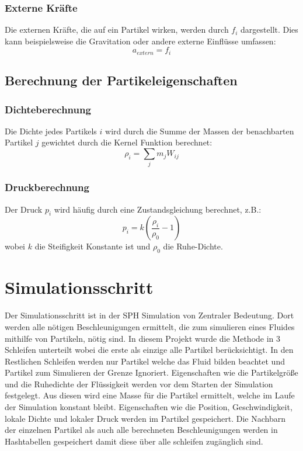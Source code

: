 \documentclass[a4paper, 12pt]{article}
\begin{document}
\subsubsection{Externe Kräfte}
Die externen Kräfte, die auf ein Partikel wirken, werden durch \( f_i \) dargestellt. Dies kann beispielsweise die Gravitation oder andere externe Einflüsse umfassen:
\begin{equation}
	a_{extern} = f_i
\end{equation}
\subsection{Berechnung der Partikeleigenschaften}
\subsubsection{Dichteberechnung}
Die Dichte jedes Partikels \(i\) wird durch die Summe der Massen der benachbarten Partikel \(j\) gewichtet durch die Kernel Funktion berechnet:
\begin{equation} \label{equ:localDichte}
	\rho_i = \sum_j m_j W_{ij}
\end{equation}

\subsubsection{Druckberechnung}
Der Druck \(p_i\) wird häufig durch eine Zustandsgleichung berechnet, z.B.:
\begin{equation} \label{equ:lokalDruck}
	p_i = k (\frac{\rho_i}{\rho_0} - 1)
\end{equation}
wobei \(k\) die Steifigkeit Konstante ist und \(\rho_0\) die Ruhe-Dichte.

\section{Simulationsschritt} \label{Kap:Simulationsschritt}
Der Simulationsschritt ist in der SPH Simulation von Zentraler Bedeutung. Dort werden alle nötigen Beschleunigungen ermittelt, die zum simulieren eines Fluides mithilfe von Partikeln, nötig sind. In diesem Projekt wurde die Methode in 3 Schleifen unterteilt wobei die erste als einzige alle Partikel berücksichtigt. In den Restlichen Schleifen werden nur Partikel welche das Fluid bilden beachtet und Partikel zum Simulieren der Grenze Ignoriert. Eigenschaften wie die Partikelgröße und die Ruhedichte der Flüssigkeit werden vor dem Starten der Simulation festgelegt. Aus diesen wird eine Masse für die Partikel ermittelt, welche im Laufe der Simulation konstant bleibt. Eigenschaften wie die Position, Geschwindigkeit, lokale Dichte und lokaler Druck werden im Partikel gespeichert. Die Nachbarn der einzelnen Partikel als auch alle berechneten Beschleunigungen werden in Hashtabellen gespeichert damit diese über alle schleifen zugänglich sind.
\end{document}
